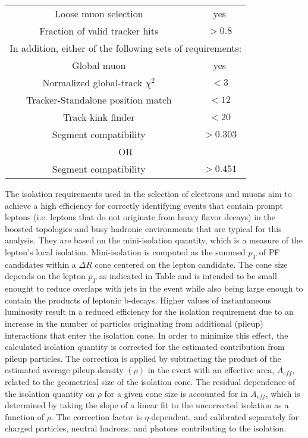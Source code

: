 \begin{table}
 \centering
 \begin{tabular}{|*{2}{c|}}
 \hline
Loose muon selection & yes \\ 
Fraction of valid tracker hits & $> 0.8$ \\
\hline
\hline
\multicolumn{2}{c}{In addition, either of the following sets of requirements:} \\
\hline
Global muon & yes \\
Normalized global-track $\chi^2$ & $< 3$ \\
Tracker-Standalone position match & $< 12$ \\
Track kink finder & $< 20$ \\
Segment compatibility & $>0.303$ \\
\hline
\multicolumn{2}{c}{OR} \\
\hline
Segment compatibility & $> 0.451$ \\
\hline
 \end{tabular}
 \caption{}
 \label{MuonID}
 \end{table}
 
 The isolation requirements used in the selection of electrons and muons aim to achieve a high efficiency for correctly identifying events that contain prompt leptons (i.e. leptons that do not originate from heavy flavor decays) in the boosted topologies and busy hadronic environments that are typical for this analysis. They are based on the mini-isolation quantity, which is a measure of the lepton's local isolation. Mini-isolation is computed as the summed $p_T$ of PF candidates within a $\Delta R$ cone centered on the lepton candidate. The cone size depends on the lepton $p_T$ as indicated in Table  and is intended to be small enought to reduce overlaps with jets in the event while also being large enough to contain the products of leptonic b-decays. Higher values of instantaneous luminosity result in a reduced efficiency for the isolation requirement due to an increase in the number of particles originating from additional (pileup) interactions that enter the isolation cone. In order to minimize this effect, the calculated isolation quantity is corrected for the estimated contribution from pileup particles. The correction is applied by subtracting the product of the estimated average pileup density $(\rho)$ in the event with an effective area, $A_{eff}$, related to the geometrical size of the isolation cone. The residual dependence of the isolation quantity on $\rho$ for a given cone size is accounted for in $A_{eff}$, which is determined by taking the slope of a linear fit to the uncorrected isolation as a function of $\rho$. The correction factor is $\eta$-dependent, and calibrated separately for charged particles, neutral hadrons, and photons contributing to the isolation. 
 
